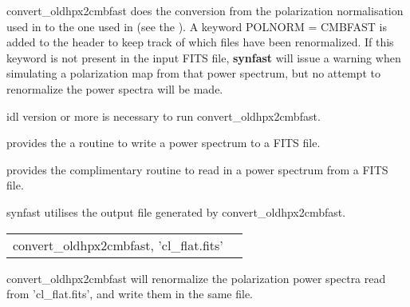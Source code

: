 \begin{codedescription}
{convert\_oldhpx2cmbfast does the conversion from the polarization normalisation
used in  to the one used in  
(see the 
).
A keyword POLNORM = CMBFAST is added to the header to keep track of which
files have been renormalized.  If this keyword is not present in the input FITS
file, \textbf{synfast} will issue a
warning when simulating a polarization map from that power spectrum, but no
attempt to renormalize the power spectra will be made. 
}
\end{codedescription}



\begin{related}
  \begin{sulist}{} %
    \item[idl] version \idlversion or more is necessary to run convert\_oldhpx2cmbfast.
    \item[\htmlref{cl2fits}{idl:cl2fits}] provides the a routine to write a
      power spectrum to a FITS file.
    \item[\htmlref{fits2cl}{idl:fits2cl}] provides the complimentary routine to read in a
      power spectrum from a FITS file.
    \item[synfast] utilises the output file generated by convert\_oldhpx2cmbfast.
  \end{sulist}
\end{related}

\begin{example}
{
\begin{tabular}{ll} %
convert\_oldhpx2cmbfast, 'cl\_flat.fits'
\end{tabular}
}
{
convert\_oldhpx2cmbfast will renormalize the polarization power spectra read
from 'cl\_flat.fits', and write them in the same file.
}
\end{example}


